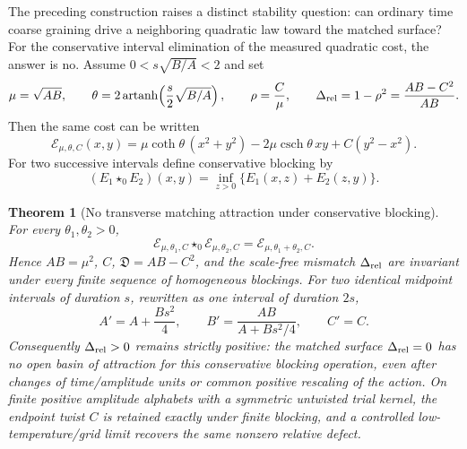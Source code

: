 \documentclass[11pt]{article}
\newtheorem{theorem}{Theorem}[section]
\theoremstyle{definition}
\theoremstyle{remark}
\begin{document}
The preceding construction raises a distinct stability question: can ordinary
time coarse graining drive a neighboring quadratic law toward the matched
surface?  For the conservative interval elimination of the measured quadratic
cost, the answer is no.  Assume $0<s\sqrt{B/A}<2$ and set
\begin{equation}
 \mu=\sqrt{AB},\qquad
 \theta=2\operatorname{artanh}\!\left(\frac{s}{2}\sqrt{B/A}\right),\qquad
 \rho=\frac{C}{\mu},\qquad
 \Delta_{\rm rel}=1-\rho^2=\frac{AB-C^2}{AB}.
 \label{eq:main-relative-rank-defect}
\end{equation}
Then the same cost can be written
\begin{equation}
 \mathcal E_{\mu,\theta,C}(x,y)
 =\mu\coth\theta\,(x^2+y^2)-2\mu\operatorname{csch}\theta\,xy
   +C(y^2-x^2).
 \label{eq:main-hyperbolic-cost}
\end{equation}
For two successive intervals define conservative blocking by
\begin{equation}
 (E_1\star_0E_2)(x,y)=\inf_{z>0}\{E_1(x,z)+E_2(z,y)\}.
 \label{eq:main-conservative-blocking}
\end{equation}

\begin{theorem}[No transverse matching attraction under conservative blocking]
\label{thm:main-no-blocking-attractor}
For every $\theta_1,\theta_2>0$,
\begin{equation}
 \boxed{
 \mathcal E_{\mu,\theta_1,C}\star_0
 \mathcal E_{\mu,\theta_2,C}
 =\mathcal E_{\mu,\theta_1+\theta_2,C}.}
 \label{eq:main-hyperbolic-blocking}
\end{equation}
Hence $AB=\mu^2$, $C$, $\mathfrak D=AB-C^2$, and the scale-free mismatch
$\Delta_{\rm rel}$ are invariant under every finite sequence of homogeneous
blockings.  For two identical midpoint intervals of duration $s$, rewritten as
one interval of duration $2s$,
\begin{equation}
 \boxed{
 A'=A+\frac{Bs^2}{4},\qquad
 B'=\frac{AB}{A+Bs^2/4},\qquad C'=C.}
 \label{eq:main-homogeneous-block-map}
\end{equation}
Consequently $\Delta_{\rm rel}>0$ remains strictly positive: the matched surface
$\Delta_{\rm rel}=0$ has no open basin of attraction for this conservative
blocking operation, even after changes of time/amplitude units or common
positive rescaling of the action.  On finite positive amplitude alphabets with a symmetric untwisted trial
kernel, the endpoint twist $C$ is retained exactly under finite blocking, and a controlled
low-temperature/grid limit recovers the same nonzero relative defect.
\end{theorem}
\end{document}
